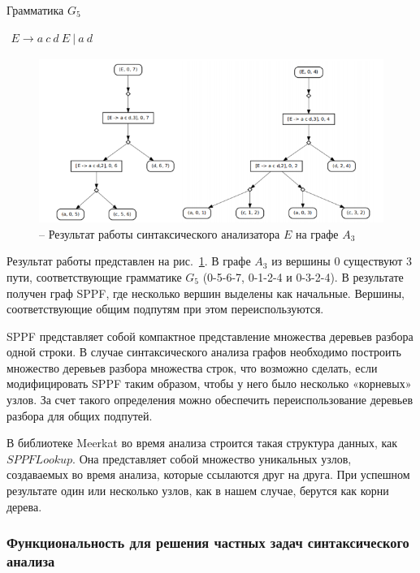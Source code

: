 \begin{listing}
\caption{Грамматика $G_5$}
\label{grmG5}
\centering
$\begin{array}{rl}
E \rightarrow a \ c \ d \ E \ | \ a \ d
\end{array}$
 \end{listing}

\begin{figure}
 \centering
 \includegraphics[width=\textwidth]{Smolina/pics/Trees2.png}
 \caption{– Результат работы синтаксического анализатора $E$ на графе $A_3$}
 \label{Trees2}
\end{figure}

Результат работы представлен на рис.~\ref{Trees2}. В графе $A_3$ из вершины 0 существуют 3 пути, соответствующие грамматике $G_5$ (0-5-6-7, 0-1-2-4 и 0-3-2-4). В результате получен граф SPPF, где несколько вершин выделены как начальные. Вершины, соответствующие общим подпутям при этом переиспользуются.

SPPF представляет собой компактное представление множества деревьев разбора одной строки. В случае синтаксического анализа графов необходимо построить множество деревьев разбора множества строк, что возможно сделать, если модифицировать SPPF таким образом, чтобы у него было несколько «корневых» узлов. За счет такого определения можно обеспечить переиспользование деревьев разбора для общих подпутей.

В библиотеке Meerkat во время анализа строится такая структура данных, как $SPPFLookup$. Она представляет собой множество уникальных узлов, создаваемых во время анализа, которые ссылаются друг на друга. При успешном результате один или несколько узлов, как в нашем случае, берутся как корни дерева.

\subsubsection{Функциональность для решения частных задач синтаксического анализа}


